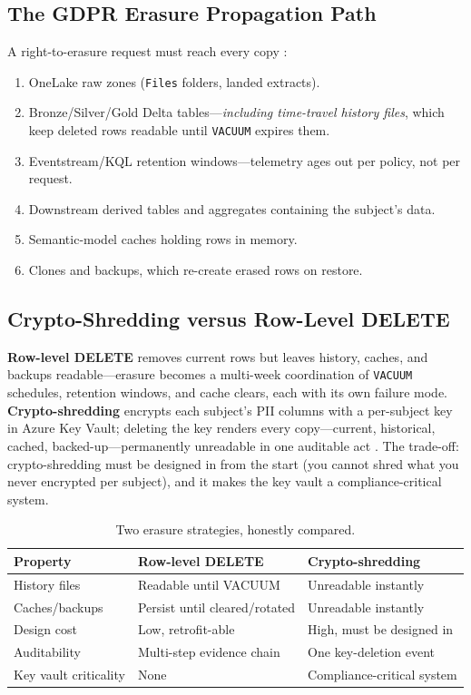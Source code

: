 \subsection{The GDPR Erasure Propagation Path}
A right-to-erasure request must reach every copy \cite{microsoftPurviewFabric}:

\begin{enumerate}
    \item OneLake raw zones (\texttt{Files} folders, landed extracts).
    \item Bronze/Silver/Gold Delta tables---\emph{including time-travel history files}, which keep deleted rows readable until \texttt{VACUUM} expires them.
    \item Eventstream/KQL retention windows---telemetry ages out per policy, not per request.
    \item Downstream derived tables and aggregates containing the subject's data.
    \item Semantic-model caches holding rows in memory.
    \item Clones and backups, which re-create erased rows on restore.
\end{enumerate}

\subsection{Crypto-Shredding versus Row-Level DELETE}
\textbf{Row-level DELETE} removes current rows but leaves history, caches, and backups readable---erasure becomes a multi-week coordination of \texttt{VACUUM} schedules, retention windows, and cache clears, each with its own failure mode. \textbf{Crypto-shredding} encrypts each subject's PII columns with a per-subject key in Azure Key Vault; deleting the key renders every copy---current, historical, cached, backed-up---permanently unreadable in one auditable act \cite{microsoftFabricSecurity}. The trade-off: crypto-shredding must be designed in from the start (you cannot shred what you never encrypted per subject), and it makes the key vault a compliance-critical system.

\begin{table}[H]
\centering
\small
\begin{tabular}{@{}p{3.6cm}p{5.0cm}p{5.0cm}@{}}
\toprule
\textbf{Property} & \textbf{Row-level DELETE} & \textbf{Crypto-shredding} \\
\midrule
History files & Readable until VACUUM & Unreadable instantly \\
Caches/backups & Persist until cleared/rotated & Unreadable instantly \\
Design cost & Low, retrofit-able & High, must be designed in \\
Auditability & Multi-step evidence chain & One key-deletion event \\
Key vault criticality & None & Compliance-critical system \\
\bottomrule
\end{tabular}
\caption{Two erasure strategies, honestly compared.}
\label{tab:chapter22-erasure}
\end{table}

